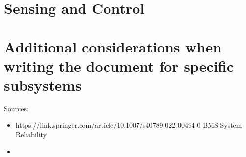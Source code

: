 \section{Sensing and Control}


\section{Additional considerations when writing the document for specific subsystems}
Sources:
\begin{itemize}
    \item https://link.springer.com/article/10.1007/s40789-022-00494-0 BMS System Reliability
    \item 
\end{itemize}


\begin{comment}





\end{comment}

\newpage